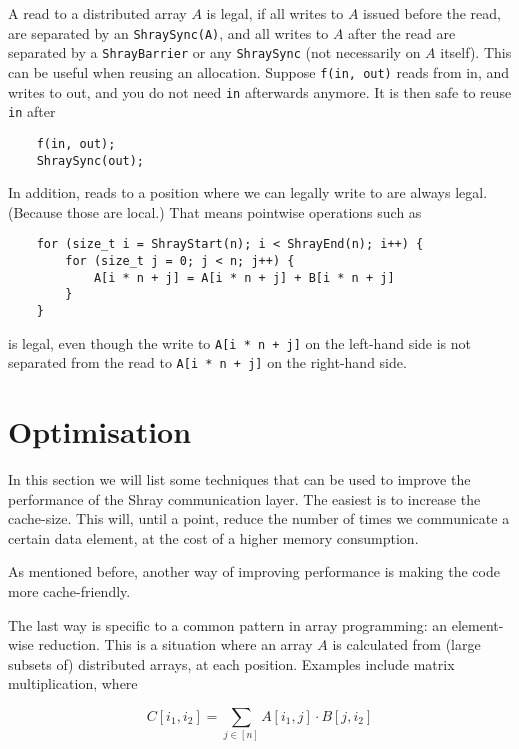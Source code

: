 \documentclass{article}
\begin{document}
\medskip

A read to a distributed array $A$ is legal, if all writes to $A$ issued before the read, are separated
by an \texttt{ShraySync(A)}, and all writes to $A$ after the read are separated by a 
\texttt{ShrayBarrier} or any \texttt{ShraySync} (not necessarily on $A$ itself). 
This can be useful when reusing an allocation. Suppose \texttt{f(in, out)} reads from in, and writes
to out, and you do not need \texttt{in} afterwards anymore. It is then safe to reuse \texttt{in} after

\begin{lstlisting}
    f(in, out);
    ShraySync(out);
\end{lstlisting}

In addition, reads to a position where we can legally write to are always legal. 
(Because those are local.) That means pointwise operations such as

\begin{lstlisting}
    for (size_t i = ShrayStart(n); i < ShrayEnd(n); i++) {
        for (size_t j = 0; j < n; j++) {
            A[i * n + j] = A[i * n + j] + B[i * n + j]
        }
    }
\end{lstlisting}

is legal, even though the write to \texttt{A[i * n + j]} on the left-hand side is not separated from
the read to \texttt{A[i * n + j]} on the right-hand side.

\section{Optimisation}

In this section we will list some techniques that can be used to improve the performance of the Shray
communication layer. The easiest is to increase the cache-size. This will, until a point, reduce the 
number of times we communicate a certain data element, at the cost of a higher memory consumption. 

\medskip

As mentioned before, another way of improving performance is making the code more cache-friendly. 

\medskip

The last way is specific to a common pattern in array programming: an element-wise reduction. 
This is a situation where an array $A$ is calculated from (large subsets of) distributed arrays, 
at each position. Examples include matrix multiplication, where 

$$C[i_1, i_2] = \sum_{j \in [n]} A[i_1, j] \cdot B[j, i_2]$$
\end{document}
